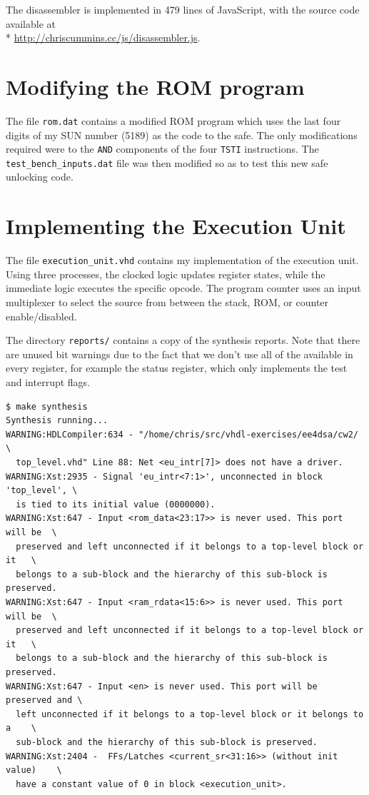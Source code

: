 \documentclass[12pt,a4paper]{article}
\begin{document}
The disassembler is implemented in 479 lines of JavaScript, with the
source code available at\\*
\url{http://chriscummins.cc/js/disassembler.js}.

\section{Modifying the ROM program}

The file \texttt{rom.dat} contains a modified ROM program which uses
the last four digits of my SUN number (5189) as the code to the
safe. The only modifications required were to the \texttt{AND}
components of the four \texttt{TSTI} instructions. The
\texttt{test\_bench\_inputs.dat} file was then modified so as to test
this new safe unlocking code.

\section{Implementing the Execution Unit}

The file \texttt{execution\_unit.vhd} contains my implementation of
the execution unit. Using three processes, the clocked logic updates
register states, while the immediate logic executes the specific
opcode. The program counter uses an input multiplexer to select the
source from between the stack, ROM, or counter enable/disabled.

The directory \texttt{reports/} contains a copy of the synthesis
reports. Note that there are unused bit warnings due to the fact that
we don't use all of the available in every register, for example the
status register, which only implements the test and interrupt flags.

\begin{verbatim}
$ make synthesis
Synthesis running...
WARNING:HDLCompiler:634 - "/home/chris/src/vhdl-exercises/ee4dsa/cw2/       \
  top_level.vhd" Line 88: Net <eu_intr[7]> does not have a driver.
WARNING:Xst:2935 - Signal 'eu_intr<7:1>', unconnected in block 'top_level', \
  is tied to its initial value (0000000).
WARNING:Xst:647 - Input <rom_data<23:17>> is never used. This port will be  \
  preserved and left unconnected if it belongs to a top-level block or it   \
  belongs to a sub-block and the hierarchy of this sub-block is preserved.
WARNING:Xst:647 - Input <ram_rdata<15:6>> is never used. This port will be  \
  preserved and left unconnected if it belongs to a top-level block or it   \
  belongs to a sub-block and the hierarchy of this sub-block is preserved.
WARNING:Xst:647 - Input <en> is never used. This port will be preserved and \
  left unconnected if it belongs to a top-level block or it belongs to a    \
  sub-block and the hierarchy of this sub-block is preserved.
WARNING:Xst:2404 -  FFs/Latches <current_sr<31:16>> (without init value)    \
  have a constant value of 0 in block <execution_unit>.
\end{verbatim}
\end{document}
